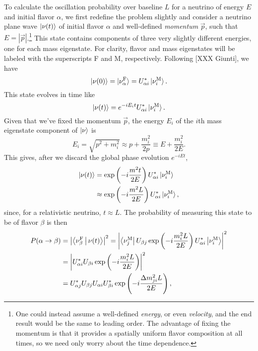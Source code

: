 \documentclass[../thesis.tex]{subfiles}
\begin{document}
To calculate the oscillation probability over baseline $L$ for a neutrino of
energy $E$ and initial flavor $\alpha$, we first redefine the problem slightly
and consider a neutrino plane wave $\ket{\nu(t)}$ of initial flavor $\alpha$ and
well-defined \emph{momentum} $\vec{p}$, such that $E = |\vec{p}|$.\footnote{One
  could instead assume a well-defined \emph{energy}, or even \emph{velocity},
  and the end result would be the same to leading order. The advantage of fixing
  the momentum is that it provides a spatially uniform flavor composition at all
  times, so we need only worry about the time dependence.} This state contains
components of three very slightly different energies, one for each mass
eigenstate. For clarity, flavor and mass eigenstates will be labeled with the
superscripts F and M, respectively. Following [XXX Giunti], we have
\begin{equation*}
\ket{\nu(0)} = \ket{\nu^{\mathrm{F}}_\alpha} = U^*_{\alpha i} \ket{\nu^{\mathrm{M}}_i}. 
\end{equation*}
This state evolves in time like
\begin{equation*}
\ket{\nu(t)} = e^{-i E_i t} U^*_{\alpha i} \ket{\nu^{\mathrm{M}}_i}.
\end{equation*}
Given that we've fixed the momentum $\vec{p}$, the energy $E_i$ of the $i$th
mass eigenstate component of $\ket{\nu}$ is
\begin{equation*}
E_i = \sqrt{p^2 + m_i^2} \approx p + \frac{m_i^2}{2p} \equiv E +
  \frac{m_i^2}{2E}.
\end{equation*}
This gives, after we discard the global phase evolution $e^{-iEt}$,
\begin{align*}
  \ket{\nu(t)} &= \exp\left(-i\frac{m^2t}{2E}\right) U^*_{\alpha i} \ket{\nu^{\mathrm{M}}_i} \\
               &\approx \exp\left(-i\frac{m^2L}{2E}\right) U^*_{\alpha i} \ket{\nu^{\mathrm{M}}_i},
\end{align*}
since, for a relativistic neutrino, $t \approx L$. The probability of measuring
this state to be of flavor $\beta$ is then
\begin{align*}
  P(\alpha \rightarrow \beta)
  &= \left|\Braket{\nu^{\mathrm{F}}_\beta|\nu(t)}\right|^2
    = \left| \Bra{\nu^{\mathrm{M}}_j} U_{\beta j} \exp\left( -i\frac{m_i^2L}{2E} \right) U^*_{\alpha i}\Ket{\nu^{\mathrm{M}}_i}\right|^2 \\
  &=  \left| U^*_{\alpha i} U_{\beta i} \exp\left( -i \frac{m_i^2L}{2E} \right)\right|^2 \\
  &= U^*_{\alpha j} U_{\beta j} U_{\alpha i} U^*_{\beta i} \exp\left( -i \frac{\Delta m^2_{ji}L}{2E} \right),
\end{align*}
\end{document}
